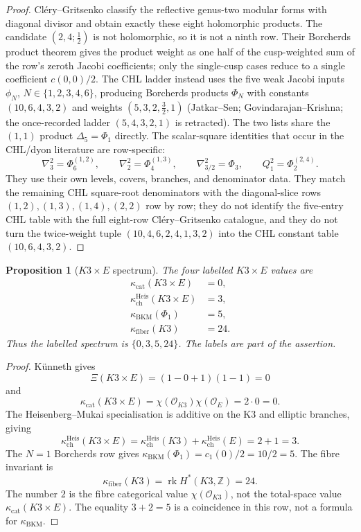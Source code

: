 \documentclass[11pt]{amsart}
\providecommand{\bZ}{\mathbb{Z}}
\providecommand{\cO}{\mathcal{O}}
\newtheorem{proposition}[theorem]{Proposition}
\theoremstyle{definition}
\theoremstyle{remark}
\begin{document}
\begin{proof}
Cl\'ery--Gritsenko classify the reflective genus-two modular forms with
diagonal divisor and obtain exactly these eight holomorphic products. The
candidate \((2,4;\frac12)\) is not holomorphic, so it is not a ninth row.
Their Borcherds product theorem gives the product weight as one half of the
cusp-weighted sum of the row's zeroth Jacobi coefficients; only the
single-cusp cases reduce to a single coefficient \(c(0,0)/2\). The CHL
ladder instead uses the five weak Jacobi inputs \(\phi_N\),
\(N\in\{1,2,3,4,6\}\), producing Borcherds products \(\Phi_N\) with
constants \((10,6,4,3,2)\) and weights \((5,3,2,\tfrac32,1)\)
(Jatkar--Sen; Govindarajan--Krishna; the once-recorded ladder
\((5,4,3,2,1)\) is retracted). The two lists share
the \((1,1)\) product \(\Delta_5=\Phi_1\) directly. The scalar-square identities
that occur in the CHL/dyon literature are row-specific:
\[
        \nabla_3^2=\Phi_6^{(1,2)},\qquad
        \nabla_2^2=\Phi_4^{(1,3)},\qquad
        \nabla_{3/2}^2=\Phi_3,\qquad
        Q_1^2=\Phi_2^{(2,4)}.
\]
They use their own levels, covers, branches, and denominator data. They
match the remaining CHL square-root denominators with the diagonal-slice
rows \((1,2),(1,3),(1,4),(2,2)\) row by row; they do
not identify the five-entry CHL table with the full eight-row
Cl\'ery--Gritsenko catalogue,
and they do not turn the twice-weight tuple
\((10,4,6,2,4,1,3,2)\) into the CHL constant table \((10,6,4,3,2)\).
\end{proof}

\begin{proposition}[\(K3\times E\) spectrum]
The four labelled \(K3\times E\) values are
\[
\begin{aligned}
\kappa_{\mathrm{cat}}(K3\times E)&=0,\\
\kappa_{\mathrm{ch}}^{\mathrm{Heis}}(K3\times E)&=3,\\
\kappa_{\mathrm{BKM}}(\Phi_1)&=5,\\
\kappa_{\mathrm{fiber}}(K3)&=24.
\end{aligned}
\]
Thus the labelled spectrum is \(\{0,3,5,24\}\). The labels are part of the
assertion.
\end{proposition}

\begin{proof}
K\"unneth gives
\[
        \Xi(K3\times E)=(1-0+1)(1-1)=0
\]
and
\[
        \kappa_{\mathrm{cat}}(K3\times E)
        =\chi(\cO_{K3})\chi(\cO_E)=2\cdot 0=0.
\]
The Heisenberg--Mukai specialisation is additive on the K3 and elliptic
branches, giving
\[
        \kappa_{\mathrm{ch}}^{\mathrm{Heis}}(K3\times E)
        =\kappa_{\mathrm{ch}}^{\mathrm{Heis}}(K3)
        +\kappa_{\mathrm{ch}}^{\mathrm{Heis}}(E)
        =2+1=3.
\]
The \(N=1\) Borcherds row gives
\(\kappa_{\mathrm{BKM}}(\Phi_1)=c_1(0)/2=10/2=5\). The fibre invariant is
\[
        \kappa_{\mathrm{fiber}}(K3)=\operatorname{rk}H^*(K3,\bZ)=24.
\]
The number \(2\) is the fibre categorical value \(\chi(\cO_{K3})\), not the
total-space value \(\kappa_{\mathrm{cat}}(K3\times E)\). The equality
\(3+2=5\) is a coincidence in this row, not a formula for
\(\kappa_{\mathrm{BKM}}\).
\end{proof}
\end{document}
